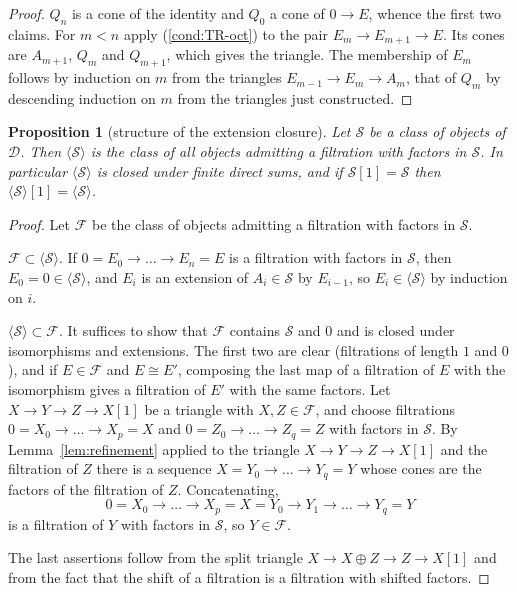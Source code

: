 \documentclass[12pt]{amsart}
\newcommand{\condref}[1]{\textup{(\ref{#1})}}
\newtheorem{proposition}[theorem]{Proposition}
\numberwithin{theorem}{section}
\theoremstyle{definition}
\newcommand{\calD}{\mathcal{D}}
\begin{document}
	\begin{proof}
		$Q_n$ is a cone of the identity and $Q_0$ a cone of $0 \to E$, whence the first two claims.
		For $m < n$ apply \condref{cond:TR-oct} to the pair $E_m \to E_{m+1} \to E$.
		Its cones are $A_{m+1}$, $Q_m$ and $Q_{m+1}$, which gives the triangle.
		The membership of $E_m$ follows by induction on $m$ from the triangles $E_{m-1} \to E_m \to A_m$, that of $Q_m$ by descending induction on $m$ from the triangles just constructed.
	\end{proof}
	
	\begin{proposition}[structure of the extension closure]
		\label{prop:extension_closure}
		Let $\mathcal{S}$ be a class of objects of $\calD$.
		Then $\langle \mathcal{S} \rangle$ is the class of all objects admitting a filtration with factors in $\mathcal{S}$.
		In particular $\langle \mathcal{S} \rangle$ is closed under finite direct sums, and if $\mathcal{S}[1] = \mathcal{S}$ then $\langle \mathcal{S} \rangle[1] = \langle \mathcal{S} \rangle$.
	\end{proposition}
	
	\begin{proof}
		Let $\mathcal{F}$ be the class of objects admitting a filtration with factors in $\mathcal{S}$.
		
		$\mathcal{F} \subset \langle \mathcal{S} \rangle$.
		If $0 = E_0 \to \ldots \to E_n = E$ is a filtration with factors in $\mathcal{S}$, then $E_0 = 0 \in \langle \mathcal{S} \rangle$, and $E_i$ is an extension of $A_i \in \mathcal{S}$ by $E_{i-1}$, so $E_i \in \langle \mathcal{S} \rangle$ by induction on $i$.
		
		$\langle \mathcal{S} \rangle \subset \mathcal{F}$.
		It suffices to show that $\mathcal{F}$ contains $\mathcal{S}$ and $0$ and is closed under isomorphisms and extensions.
		The first two are clear (filtrations of length $1$ and $0$), and if $E \in \mathcal{F}$ and $E \cong E'$, composing the last map of a filtration of $E$ with the isomorphism gives a filtration of $E'$ with the same factors.
		Let $X \to Y \to Z \to X[1]$ be a triangle with $X, Z \in \mathcal{F}$, and choose filtrations $0 = X_0 \to \ldots \to X_p = X$ and $0 = Z_0 \to \ldots \to Z_q = Z$ with factors in $\mathcal{S}$.
		By Lemma~\ref{lem:refinement} applied to the triangle $X \to Y \to Z \to X[1]$ and the filtration of $Z$ there is a sequence $X = Y_0 \to \ldots \to Y_q = Y$ whose cones are the factors of the filtration of $Z$.
		Concatenating,
		\[
		0 = X_0 \to \ldots \to X_p = X = Y_0 \to Y_1 \to \ldots \to Y_q = Y
		\]
		is a filtration of $Y$ with factors in $\mathcal{S}$, so $Y \in \mathcal{F}$.
		
		The last assertions follow from the split triangle $X \to X \oplus Z \to Z \to X[1]$ and from the fact that the shift of a filtration is a filtration with shifted factors.
	\end{proof}
	
\end{document}
